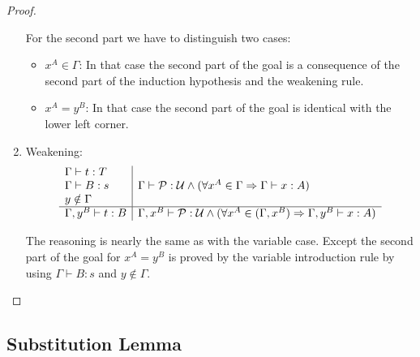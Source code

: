 \begin{theorem}
\begin{proof}
\begin{enumerate}
            For the second part we have to distinguish two cases:
            \begin{itemize}
            \item $x^A \in \Gamma$: In that case the second part of the goal is
                a consequence of the second part of the induction hypothesis and
                    the weakening rule.
            \item $x^A = y^B$: In that case the second part of the goal is
                identical with the lower left corner.
            \end{itemize}

        \item Weakening:
            $$
            \begin{array}{l|l}
                \Gamma \vdash t : T
                \\
                \Gamma \vdash B: s
                &
                \Gamma \vdash {\cal P} : {\cal U}
                \land
                (\forall x^A \in \Gamma \Rightarrow \Gamma \vdash x : A)
                \\
                y \notin \Gamma
                \\
                \hline
                \Gamma, y^B \vdash t: B
                &
                \Gamma, x^B \vdash {\cal P}:{\cal U}
                \land
                (\forall x^A \in (\Gamma, x^B) \Rightarrow \Gamma, y^B \vdash x : A)
            \end{array}
            $$

            The reasoning is nearly the same as with the variable case. Except
            the second part of the goal for $x^A = y^B$ is proved by the
            variable introduction rule by using $\Gamma \vdash B : s$ and $y
            \notin \Gamma$.
        \end{enumerate}
    \end{proof}
\end{theorem}



\subsection{Substitution Lemma}



